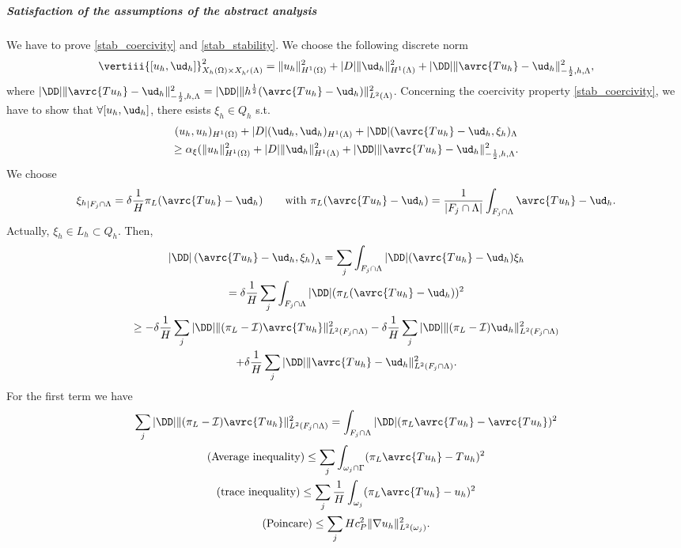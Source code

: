 \subparagraph{Satisfaction of the assumptions of the 
abstract analysis} 
We have to prove \eqref{stab_coercivity} and \eqref{stab_stability}.
We choose the following discrete norm
\begin{equation*}
\vertiii{[u_h, {\ud}_h]}^2_{X_h(\Omega)\times X_{h'}(\Lambda) }
= \|u_h\|^2_{H^1(\Omega)}+|D|\|{\ud}_h\|^2_{H^1(\Lambda)} + |\DD|\|\avrc{Tu_h} - {\ud}_h\|^2_{-\frac 12, h, \Lambda},
\end{equation*}
where $|\DD|\|\avrc{Tu_h} - {\ud}_h\|^2_{-\frac 12, h, \Lambda} = |\DD|\|h^{\frac 12} (\avrc{Tu_h} - {\ud}_h)\|^2_{L^2(\Lambda)} $.
Concerning the coercivity property \eqref{stab_coercivity}, we have to show that $\forall [u_h, {\ud}_h]$, there esists $\xi_h \in Q_h$ s.t.
\begin{multline*}
(u_h,u_h)_{H^1(\Omega)}+ |D|({\ud}_h, {\ud}_h)_{H^1(\Lambda)} +  |\DD| (\avrc{Tu_h} - {\ud}_h, \xi_h)_{\Lambda} \\
\geq \alpha_{\xi}(\|u_h\|^2_{H^1(\Omega)}+|D|\|{\ud}_h\|^2_{H^1(\Lambda)}+ |\DD|\|\avrc{Tu_h} - {\ud}_h\|^2_{-\frac 12, h, \Lambda}.
\end{multline*}
We choose 
\begin{equation*}
{\xi_h}_{|F_j\cap \Lambda}=\delta \frac 1H \pi_L(\avrc{Tu_h}-{\ud}_h) \qquad \text{with } \pi_L(\avrc{Tu_h}-{\ud}_h) =\frac{1}{|F_j\cap \Lambda|}\int_{F_j\cap \Lambda} \avrc{Tu_h}- {\ud}_h.
\end{equation*}
Actually, $\xi_h\in L_h \subset Q_h$. Then,
\begin{multline*}
|\DD|\left( \avrc{Tu_h} - {\ud}_h, \xi _h \right)_{\Lambda} 
= \sum_j \int_{F_j\cap \Lambda} |\DD|( \avrc{Tu_h} - {\ud}_h)\xi_h
\\
= \delta \frac{1}{H} \sum_j \int_{F_j\cap \Lambda}|\DD| (\pi_L( \avrc{Tu_h} - {\ud}_h) )^2
\\
\geq -\delta \frac 1H \sum_j|\DD| \|(\pi_L - \mathcal{I})\avrc{Tu_h}\|^2_{L^2(F_j\cap \Lambda)}
- \delta \frac 1H \sum_j |\DD|\|(\pi_L - \mathcal{I}){\ud}_h\|^2_{L^2(F_j\cap \Lambda)}
\\ 
+ \delta \frac 1H \sum_j |\DD|\|\avrc{Tu_h}-{\ud}_h\|^2_{L^2(F_j\cap \Lambda)}. 
\end{multline*}
For the first term we have
\begin{multline*}
\sum _j |\DD| \|(\pi_L - \mathcal{I})\avrc{Tu_h}\|^2_{L^2(F_j\cap \Lambda)} =\int _{F_j \cap \Lambda} |\DD| (\pi_L \avrc{Tu_h}- \avrc{Tu_h})^2
\\
(\text{Average inequality)} \leq \sum _j  \int_{\omega _j \cap \Gamma} (\pi_L \avrc{Tu_h} -Tu_h)^2 
\\
(\text{trace inequality}) \leq \sum _j  \frac 1H \int_{\omega_j}(\pi_L \avrc{Tu_h} - u_h)^2 
\\ 
(\text{Poincare})\leq \sum _j  H c_P ^2 \|\nabla u_h\|^2_{L^2(\omega _j)}.
\end{multline*}
